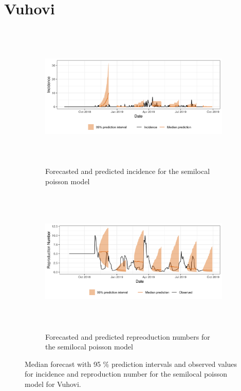 \section{ Vuhovi }\begin{figure}[H]\begin{subfigure}{\textwidth}  \centering  \includegraphics[width=0.9\linewidth, height=7cm]{../output/Vuhovi_predictions.png}  \caption{Forecasted and predicted incidence for the semilocal poisson model}\end{subfigure}

\begin{subfigure}{\textwidth}  \centering  \includegraphics[width=0.9\linewidth, height=7cm]{../output/Vuhovi_Rs.png}  \caption{Forecasted and predicted repreoduction numbers for the semilocal poisson model}\end{subfigure}  \caption{Median forecast with 95 \% prediction intervals and observed values for incidence and reproduction number for the semilocal poisson model for Vuhovi.}\end{figure}

